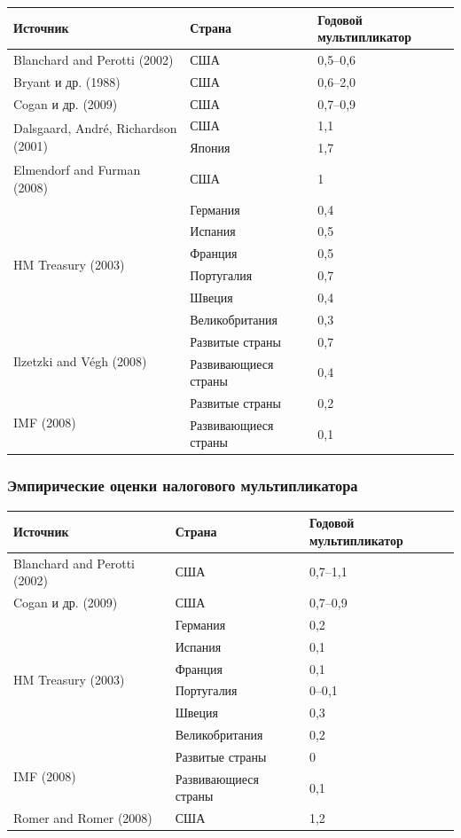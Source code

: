 \documentclass[10pt,a4paper]{article}
\begin{document}
\begin{center}
\begin{tabular}{p{5.2cm}p{4cm}p{2.5cm}}
\toprule
\textbf{Источник} & \textbf{Страна} & \textbf{Годовой мультипликатор}\\
\midrule
Blanchard and Perotti (2002) & США & 0{,}5--0{,}6\\
Bryant и др. (1988) & США & 0{,}6--2{,}0\\
Cogan и др. (2009) & США & 0{,}7--0{,}9\\
\multirow{2}{5.2cm}{Dalsgaard, André, Richardson (2001)} & США & 1{,}1\\
& Япония & 1{,}7\\
Elmendorf and Furman (2008) & США & 1\\
\multirow{6}{5.2cm}{HM Treasury (2003)} & Германия & 0{,}4\\
& Испания & 0{,}5\\
& Франция & 0{,}5\\
& Португалия & 0{,}7\\
& Швеция & 0{,}4\\
& Великобритания & 0{,}3\\
\multirow{2}{5.2cm}{Ilzetzki and V\'egh (2008)} & Развитые страны & 0{,}7\\
& Развивающиеся страны & 0{,}4\\
\multirow{2}{5.2cm}{IMF (2008)} & Развитые страны & 0{,}2\\
& Развивающиеся страны & 0{,}1\\
\bottomrule
\end{tabular}
\end{center}
 
\subsubsection{Эмпирические оценки налогового мультипликатора}
 
\begin{center}
\begin{tabular}{p{5.2cm}p{4cm}p{2.5cm}}
\toprule
\textbf{Источник} & \textbf{Страна} & \textbf{Годовой мультипликатор}\\
\midrule
Blanchard and Perotti (2002) & США & 0{,}7--1{,}1\\
Cogan и др. (2009) & США & 0{,}7--0{,}9\\
\multirow{6}{5.2cm}{HM Treasury (2003)} & Германия & 0{,}2\\
& Испания & 0{,}1\\
& Франция & 0{,}1\\
& Португалия & 0--0{,}1\\
& Швеция & 0{,}3\\
& Великобритания & 0{,}2\\
\multirow{2}{5.2cm}{IMF (2008)} & Развитые страны & 0\\
& Развивающиеся страны & 0{,}1\\
Romer and Romer (2008) & США & 1{,}2\\
\bottomrule
\end{tabular}
\end{center}
 
\end{document}
